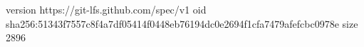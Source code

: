 version https://git-lfs.github.com/spec/v1
oid sha256:51343f7557c8f4a7df05414f0448eb76194dc0e2694f1cfa7479afefcbc0978e
size 2896
